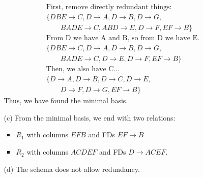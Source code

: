 \documentclass{article}
\begin{document}
\begin{enumerate}
\begin{enumerate}
\begin{equation*}
            \begin{aligned}
            & \text{First, remove directly redundant things:} \\
            & \big\{DBE \rightarrow C, D \rightarrow A, D \rightarrow B, D \rightarrow G, \\
            & \qquad BADE \rightarrow C, ABD \rightarrow E, D \rightarrow F, EF \rightarrow B \big\} \\
            & \text{From D we have A and B, so from D we have E.} \\
            & \big\{DBE \rightarrow C, D \rightarrow A, D \rightarrow B, D \rightarrow G, \\
            & \qquad BADE \rightarrow C, D \rightarrow E, D \rightarrow F, EF \rightarrow B \big\} \\
            & \text{Then, we also have C...} \\
            & \big\{D \rightarrow A, D \rightarrow B, D \rightarrow C, D \rightarrow E, \\
            & \qquad D \rightarrow F, D \rightarrow G, EF \rightarrow B \big\}
            \end{aligned}
            \end{equation*}
        Thus, we have found the minimal basis.
    \item [(c)] From the minimal basis, we end with two relations:
        \begin{itemize}
        \item $R_1$ with columns $EFB$ and FDs $EF \rightarrow B$
        \item $R_2$ with columns $ACDEF$ and FDs $D \rightarrow ACEF$.
        \end{itemize}
    \item [(d)] The schema does not allow redundancy.
    \end{enumerate}
\end{enumerate}
\end{document}
